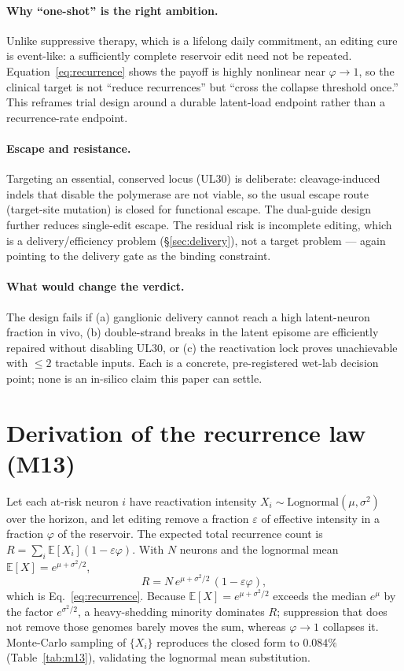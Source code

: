 \documentclass[11pt,a4paper]{article}
\begin{document}
\paragraph{Why ``one-shot'' is the right ambition.}
Unlike suppressive therapy, which is a lifelong daily commitment, an editing
cure is event-like: a sufficiently complete reservoir edit need not be repeated.
Equation~\eqref{eq:recurrence} shows the payoff is highly nonlinear near
$\varphi\to1$, so the clinical target is not ``reduce recurrences'' but ``cross
the collapse threshold once.'' This reframes trial design around a durable
latent-load endpoint rather than a recurrence-rate endpoint.

\paragraph{Escape and resistance.}
Targeting an essential, conserved locus (UL30) is deliberate: cleavage-induced
indels that disable the polymerase are not viable, so the usual escape route
(target-site mutation) is closed for functional escape. The dual-guide design
further reduces single-edit escape. The residual risk is incomplete editing,
which is a delivery/efficiency problem (\S\ref{sec:delivery}), not a target
problem --- again pointing to the delivery gate as the binding constraint.

\paragraph{What would change the verdict.}
The design fails if (a) ganglionic delivery cannot reach a high latent-neuron
fraction in vivo, (b) double-strand breaks in the latent episome are efficiently
repaired without disabling UL30, or (c) the reactivation lock proves
unachievable with $\le2$ tractable inputs. Each is a concrete, pre-registered
wet-lab decision point; none is an in-silico claim this paper can settle.

\appendix
\section{Derivation of the recurrence law (M13)}
\label{app:m13}
Let each at-risk neuron $i$ have reactivation intensity $X_i\sim
\mathrm{Lognormal}(\mu,\sigma^2)$ over the horizon, and let editing remove a
fraction $\varepsilon$ of effective intensity in a fraction $\varphi$ of the
reservoir. The expected total recurrence count is
$R = \sum_i \mathbb{E}[X_i](1-\varepsilon\varphi)$. With $N$ neurons and the
lognormal mean $\mathbb{E}[X]=e^{\mu+\sigma^2/2}$,
\[
R = N\,e^{\mu+\sigma^2/2}\,(1-\varepsilon\varphi),
\]
which is Eq.~\eqref{eq:recurrence}. Because $\mathbb{E}[X]=e^{\mu+\sigma^2/2}$
exceeds the median $e^{\mu}$ by the factor $e^{\sigma^2/2}$, a heavy-shedding
minority dominates $R$; suppression that does not remove those genomes barely
moves the sum, whereas $\varphi\to1$ collapses it. Monte-Carlo sampling of
$\{X_i\}$ reproduces the closed form to $0.084\%$ (Table~\ref{tab:m13}),
validating the lognormal mean substitution.
\end{document}

